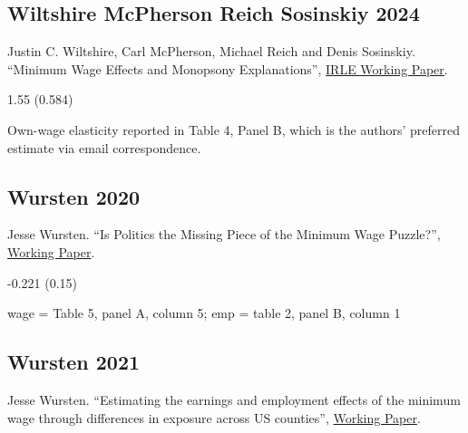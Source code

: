 \subsection*{Wiltshire McPherson Reich Sosinskiy 2024}
\vspace{-0.7em}

\noindent Justin C. Wiltshire, Carl McPherson, Michael Reich and Denis Sosinskiy. ``Minimum Wage Effects and Monopsony Explanations'', \href{https://irle.berkeley.edu/wp-content/uploads/2023/09/minimum-wage-effects-and-monopsony-explanations-augustREVISED.pdf}{IRLE Working Paper}.

\vspace{0.7em}

 1.55 (0.584)

\vspace{0.7em}

 Own-wage elasticity reported in Table 4, Panel B, which is the authors' preferred estimate via email correspondence.

\subsection*{Wursten 2020}
\vspace{-0.7em}

\noindent Jesse Wursten. ``Is Politics the Missing Piece of the Minimum Wage Puzzle?'', \href{http://dx.doi.org/10.13140/RG.2.2.14177.20329}{Working Paper}.

\vspace{0.7em}

 -0.221 (0.15)

\vspace{0.7em}

 wage = Table 5, panel A, column 5; emp = table 2, panel B, column 1

\subsection*{Wursten 2021}
\vspace{-0.7em}

\noindent Jesse Wursten. ``Estimating the earnings and employment effects of the minimum wage through differences in exposure across US counties'', \href{https://www.dropbox.com/s/2f5j0mjyama8q0p/CAMWE_draft36.pdf?dl=0}{Working Paper}.

